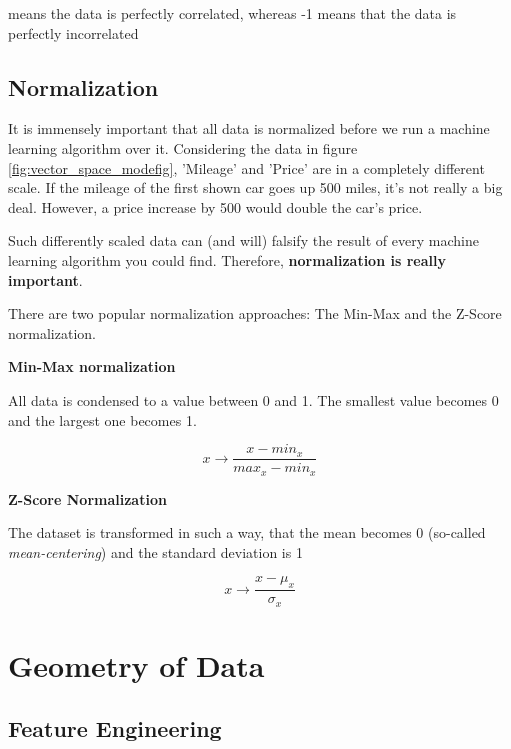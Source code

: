 \documentclass[11pt]{article}
\begin{document}
 means the data is perfectly correlated, whereas -1 means that the data is perfectly incorrelated

\subsection{Normalization}
It is immensely important that all data is normalized before we run a machine learning algorithm over it. Considering the data in figure \ref{fig:vector_space_modefig}, 'Mileage' and 'Price' are in a completely different scale. If the mileage of the first shown car goes up 500 miles, it's not really a big deal. However, a price increase by 500 would double the car's price.

Such differently scaled data can (and will) falsify the result of every machine learning algorithm you could find. Therefore, \textbf{normalization is really important}.

\vspace{10px}

\noindent There are two popular normalization approaches: The Min-Max and the Z-Score normalization.

\newpage

\noindent \textbf{Min-Max normalization}

\noindent All data is condensed to a value between 0 and 1. The smallest value becomes 0 and the largest one becomes 1.

\begin{equation}
    x \rightarrow \frac{x - min_{x}}{max_{x}-min_{x}}
\end{equation}

\noindent \textbf{Z-Score Normalization}

\noindent The dataset is transformed in such a way, that the mean becomes 0 (so-called \textit{mean-centering}) and the standard deviation is 1

\begin{equation}
    x \rightarrow \frac{x - \mu_{x}}{\sigma_{x}}
\end{equation}

\section{Geometry of Data}

\subsection{Feature Engineering}
\end{document}
